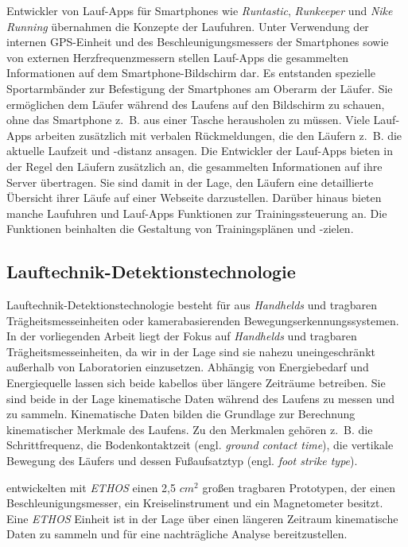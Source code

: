 Entwickler von Lauf-Apps für Smartphones wie \emph{Runtastic}, \emph{Runkeeper} und \emph{Nike Running} übernahmen die Konzepte der Laufuhren. Unter Verwendung der internen \ac{GPS}-Einheit und des Beschleunigungsmessers der Smartphones sowie von externen Herzfrequenzmessern stellen Lauf-Apps die gesammelten Informationen auf dem Smartphone-Bildschirm dar. Es entstanden spezielle Sportarmbänder zur Befestigung der Smartphones am Oberarm der Läufer. Sie ermöglichen dem Läufer während des Laufens auf den Bildschirm zu schauen, ohne das Smartphone z.~B. aus einer Tasche herausholen zu müssen. Viele Lauf-Apps arbeiten zusätzlich mit verbalen Rückmeldungen, die den Läufern z.~B. die aktuelle Laufzeit und -distanz ansagen. Die Entwickler der Lauf-Apps bieten in der Regel den Läufern zusätzlich an, die gesammelten Informationen auf ihre Server übertragen. Sie sind damit in der Lage, den Läufern eine detaillierte Übersicht ihrer Läufe auf einer Webseite darzustellen. Darüber hinaus bieten manche Laufuhren und Lauf-Apps Funktionen zur Trainingssteuerung an. Die Funktionen beinhalten die Gestaltung von Trainingsplänen und -zielen.

\subsection{Lauftechnik-Detektionstechnologie}
\label{sub:lauftechnik_detektionstechnologie}

Lauftechnik-Detektionstechnologie besteht für \citet{Jensen2014} aus \emph{Handhelds} und tragbaren Trägheitsmesseinheiten oder kamerabasierenden Bewegungserkennungssystemen. In der vorliegenden Arbeit liegt der Fokus auf \emph{Handhelds} und tragbaren Trägheitsmesseinheiten, da wir in der Lage sind sie nahezu uneingeschränkt außerhalb von Laboratorien einzusetzen. Abhängig von Energiebedarf und Energiequelle lassen sich beide kabellos über längere Zeiträume betreiben. Sie sind beide in der Lage kinematische Daten während des Laufens zu messen und zu sammeln. Kinematische Daten bilden die Grundlage zur Berechnung kinematischer Merkmale des Laufens. Zu den Merkmalen gehören z.~B. die Schrittfrequenz, die Bodenkontaktzeit (engl. \emph{ground contact time}), die vertikale Bewegung des Läufers und dessen Fußaufsatztyp (engl. \emph{foot strike type}).

\citet{Harms2010} entwickelten mit \emph{ETHOS} einen 2,5 $cm^{2}$ großen tragbaren Prototypen, der einen Beschleunigungsmesser, ein Kreiselinstrument und ein Magnetometer besitzt. Eine \emph{ETHOS} Einheit ist in der Lage über einen längeren Zeitraum kinematische Daten zu sammeln und für eine nachträgliche Analyse bereitzustellen.

